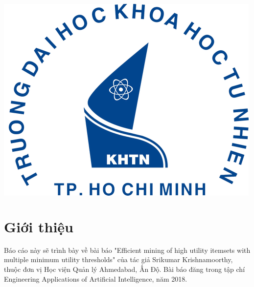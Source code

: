 \begin{titlepage}




\includegraphics{logo/rsz_3logo-khtn.png}\\[1cm] %
 

\vfill %

\end{titlepage}


\section{Giới thiệu}
Báo cáo này sẽ trình bày về bài báo "Efficient mining of high utility itemsets with multiple minimum utility thresholds" \cite{krishnamoorthy2018efficient} của tác giả Srikumar Krishnamoorthy, thuộc đơn vị Học viện Quản lý Ahmedabad, Ấn Độ. Bài báo đăng trong tập chí Engineering Applications of Artificial Intelligence, năm 2018. 


